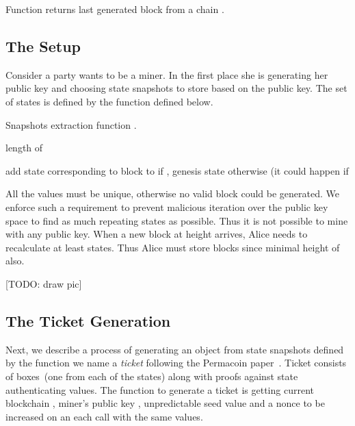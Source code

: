 \documentclass[conference,compsoc]{IEEEtran}
\begin{document}
Function  returns last generated block from a chain .


\subsection{The Setup}

Consider a party wants to be a miner. In the first place she is generating her public key  and choosing state snapshots to store based on the public key. The set of states is defined by the function  defined below. 

\begin{algorithm}[H]
\label{alg_snapshots}
\caption{Snapshots extraction function .}
\label{algo_choose_snapshots}
\begin{algorithmic}[1]


\State  length of 


\State 


 

\State add state corresponding to block  to  if , genesis state otherwise (it could happen if 

\EndFor

\State \Return 

\EndFunction

\end{algorithmic}
\end{algorithm}

All the  values must be unique, otherwise no valid block could be generated. We enforce such a requirement to prevent malicious iteration over the public key space to find as much repeating states as possible. Thus it is not possible to mine with any public key.  When a new block at height  arrives, Alice needs to recalculate at least  states. Thus Alice must store blocks since minimal height of  also.

[TODO: draw pic]


\subsection{The Ticket Generation}

Next, we describe a process of generating an object from  state snapshots defined by the  function we name a \textit{ticket} following the Permacoin paper~\cite{miller2014permacoin}. Ticket consists of  boxes~(one from each of the states) along with proofs against state authenticating values. The function  to generate a ticket is getting current blockchain , miner's public key , unpredictable seed value  and a nonce  to be increased on an each call with the same  values.
\end{document}
